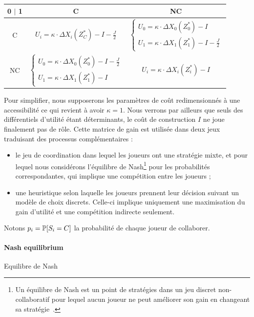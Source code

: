 \begin{center}
\begin{tabular}{ |c|c|c| } 
 \hline
 0 $|$ 1  & C & NC \\ \hline
 C & $U_i = \kappa \cdot \Delta X_i(Z^{\ast}_C) - I - \frac{J}{2}$
   & $\begin{cases}U_0 = \kappa \cdot \Delta X_0(Z^{\ast}_0)-I \\U_1 = \kappa \cdot \Delta X_1(Z^{\ast}_1)-I - \frac{J}{2}\end{cases}$ \\ \hline
 NC & $\begin{cases}U_0 = \kappa \cdot \Delta X_0(Z^{\ast}_0)-I - \frac{J}{2}\\U_1 = \kappa \cdot \Delta X_1(Z^{\ast}_1)-I\end{cases}$
   & $U_i = \kappa \cdot \Delta X_i(Z^{\ast}_i) - I$ \\
 \hline
\end{tabular}
\end{center}

Pour simplifier, nous supposerons les paramètres de coût redimensionnés à une accessibilité ce qui revient à avoir $\kappa = 1$. Nous verrons par ailleurs que seuls des différentiels d'utilité étant déterminants, le coût de construction $I$ ne joue finalement pas de rôle. Cette matrice de gain est utilisée dans deux jeux traduisant des processus complémentaires :
\begin{itemize}
	\item le jeu de coordination dans lequel les joueurs ont une stratégie mixte, et pour lequel nous considérons l'équilibre de Nash\footnote{Un équilibre de Nash est un point de stratégies dans un jeu discret non-collaboratif pour lequel aucun joueur ne peut améliorer son gain en changeant sa stratégie~\cite{ordeshook1986game}.} pour les probabilités correspondantes, qui implique une compétition entre les joueurs ;
	\item une heuristique selon laquelle les joueurs prennent leur décision suivant un modèle de choix discrets. Celle-ci implique uniquement une maximisation du gain d'utilité et une compétition indirecte seulement.
\end{itemize}

Notons $p_i = \operatorname{\mathbb{P}}\!\left[S_i = C\right]$ la probabilité de chaque joueur de collaborer.


\paragraph{Nash equilibrium}{Equilibre de Nash}

